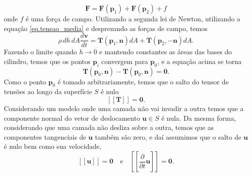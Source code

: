 \begin{equation*}
\mathbf{F}=\mathbf{F}(\mathbf{p}_1)+\mathbf{F}(\mathbf{p}_2)+f
\end{equation*} 
onde $f$ \'e uma for\c{c}a de campo. Utilizando a segunda lei de Newton, utilizando a equa\c{c}\~ao \ref{eq.tensao_media} e desprezando as for\c{c}as de campo, temos
\begin{equation*}
\rho\,dh\,dA\frac{d\mathbf{v}}{dt}=\mathbf{T}(\mathbf{p}_1,\mathbf{n})dA+\mathbf{T}(\mathbf{p}_2,-\mathbf{n})dA.
\end{equation*} 
Fazendo o limite quando $h\to 0$ e mantendo constantes as \'areas das bases do cilindro, temos que os pontos $\mathbf{p}_i$ convergem para $\mathbf{p}_0$, e a equa\c{c}\~ao acima se torna
\begin{equation*}
\mathbf{T}(\mathbf{p}_0,\mathbf{n})-\mathbf{T}(\mathbf{p}_0,\mathbf{n})=\mathbf{0}.
\end{equation*}
Como o ponto $\mathbf{p}_0$ \'e tomado arbitrariamente, temos que o salto do tensor de tens\~oes ao longo da superf\'icie $S$ \'e nulo
\begin{equation*}
\left[\left[\mathbf{T}\right]\right]=\mathbf{0}.
\end{equation*}
Considerando um modelo onde uma camada n\~ao vai invadir a outra temos que a componente normal do vetor de deslocamento $\mathbf{u}\in S$ \'e nula. Da mesma forma, considerando que uma camada n\~ao desliza sobre a outra, temos que as componentes tangenciais de $\mathbf{u}$ tamb\'em s\~ao zero, e da\'i assumimos que o salto de $\mathbf{u}$ \'e nulo bem como sua velocidade,
\begin{equation*}
\left[\left[\mathbf{u}\right]\right]=\mathbf{0}\quad\text{e}\quad\left[\left[\frac{\partial}{\partial t}\mathbf{u}\right]\right]=\mathbf{0}.
\end{equation*}

